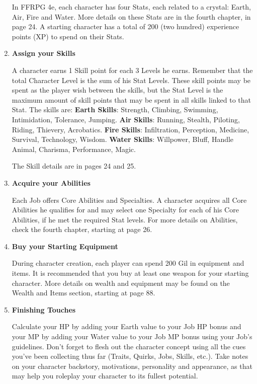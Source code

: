 \begin{multicols}{2}
\begin{enumerate}
In FFRPG 4e, each character has four Stats, each related to a crystal: Earth, Air, Fire and Water. More details on these Stats are in the fourth chapter, in page 24. A starting character has a total of 200 (two hundred) experience points (XP) to spend on their Stats. 

\item \textbf{Assign your Skills}

A character earns 1 Skill point for each 3 Levels he earns. Remember that the total Character Level is the sum of his Stat Levels. These skill points may be spent as the player wish between the skills, but the Stat Level is the maximum amount of skill points that may be spent in all skills linked to that Stat. The skills are:
\textbf{Earth Skills}: Strength, Climbing, Swimming, Intimidation, Tolerance, Jumping.
\textbf{Air Skills}: Running, Stealth, Piloting, Riding, Thievery, Acrobatics.
\textbf{Fire Skills}: Infiltration, Perception, Medicine, Survival, Technology, Wisdom.
\textbf{Water Skills}: Willpower, Bluff, Handle Animal, Charisma, Performance, Magic.

The Skill details are in pages 24 and 25.

\item \textbf{Acquire your Abilities}

Each Job offers Core Abilities and Specialties. A character acquires all Core Abilities he qualifies for and may select one Specialty for each of his Core Abilities, if he met the required Stat levels. For more details on Abilities, check the fourth chapter, starting at page 26. 

\item \textbf{Buy your Starting Equipment}

During character creation, each player can spend 200 Gil in equipment and items. It is recommended that you buy at least one weapon for your starting character. More details on wealth and equipment may be found on the Wealth and Items section, starting at page 88.

\item \textbf{Finishing Touches}

Calculate your HP by adding your Earth value to your Job HP bonus and your MP by adding your Water value to your Job MP bonus using your Job's guidelines. Don't forget to flesh out the character concept using all the cues you've been collecting thus far (Traits, Quirks, Jobs, Skills, etc.). Take notes on your character backstory, motivations, personality and appearance, as that may help you roleplay your character to its fullest potential.

\end{enumerate}
\end{multicols}

